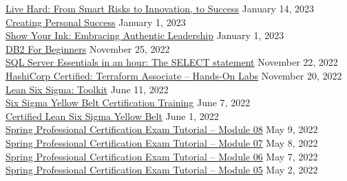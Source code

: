 \documentclass[10pt]{res} %
\begin{document}
\begin{resume}
\href{https://www.udemy.com/certificate/UC-25379a44-d670-42c3-8e74-0b8e5189d5b7}{\color{blue}Live Hard: From Smart Risks to Innovation, to Success} \hfill January 14, 2023 \\
\href{https://www.udemy.com/certificate/UC-a9b58872-bda4-4c6f-b3b5-dd3b3b8c4ba7}{\color{blue}Creating Personal Success} \hfill January 1, 2023 \\
\href{https://www.udemy.com/certificate/UC-0b676451-b8a4-42ed-b187-609eba434eca}{\color{blue}Show Your Ink: Embracing Authentic Leadership} \hfill January 1, 2023 \\
\href{https://www.udemy.com/certificate/UC-6929716b-d91a-4e45-b53e-a10c1612a478}{\color{blue}DB2 For Beginners} \hfill November 25, 2022 \\
\href{https://www.udemy.com/certificate/UC-9015e049-fa1d-4df9-b7bc-acd2ad2c57dc}{\color{blue}SQL Server Essentials in an hour: The SELECT statement} \hfill November 22, 2022 \\
\href{https://www.udemy.com/certificate/UC-a6cf5103-72a4-4dd2-8236-c23dcfb9cc39}{\color{blue}HashiCorp Certified: Terraform Associate -- Hands-On Labs} \hfill November 20, 2022 \\
\href{https://www.udemy.com/certificate/UC-4fa16a3c-833f-4210-86e7-46009529cba8}{\color{blue}Lean Six Sigma: Toolkit} \hfill June 11, 2022 \\
\href{https://www.udemy.com/certificate/UC-956f27f3-a9aa-4969-aa1d-afcd90415eb1}{\color{blue}Six Sigma Yellow Belt Certification Training} \hfill June 7, 2022 \\
\href{https://www.udemy.com/certificate/UC-a6f40d7d-d1cc-468c-927f-d7ba8e58a93c}{\color{blue}Certified Lean Six Sigma Yellow Belt} \hfill June 1, 2022 \\
\href{https://www.udemy.com/certificate/UC-1eea82c1-c1e0-4d70-8949-9adcf33e1710}{\color{blue}Spring Professional Certification Exam Tutorial -- Module 08} \hfill May 9, 2022 \\
\href{https://www.udemy.com/certificate/UC-6532cb79-caf7-4ec2-af2a-3b8401b54ace}{\color{blue}Spring Professional Certification Exam Tutorial -- Module 07} \hfill May 8, 2022 \\
\href{https://www.udemy.com/certificate/UC-c5ba3218-7384-48c0-b6b5-d6e2ad8ef59f}{\color{blue}Spring Professional Certification Exam Tutorial -- Module 06} \hfill May 7, 2022 \\
\href{https://www.udemy.com/certificate/UC-8af5d0bf-5c0e-4c2e-ac57-4e1939f0125e}{\color{blue}Spring Professional Certification Exam Tutorial -- Module 05} \hfill May 2, 2022 \\

\end{resume}
\end{document}
